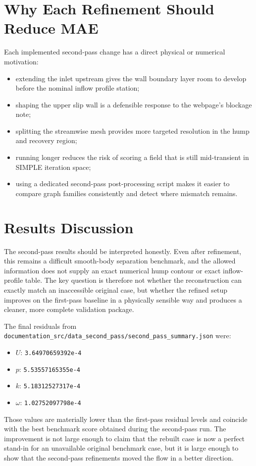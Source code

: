 \documentclass[11pt]{article}
\begin{document}
\section{Why Each Refinement Should Reduce MAE}
Each implemented second-pass change has a direct physical or numerical motivation:
\begin{itemize}
\item extending the inlet upstream gives the wall boundary layer room to develop before the nominal inflow profile station;
\item shaping the upper slip wall is a defensible response to the webpage's blockage note;
\item splitting the streamwise mesh provides more targeted resolution in the hump and recovery region;
\item running longer reduces the risk of scoring a field that is still mid-transient in SIMPLE iteration space;
\item using a dedicated second-pass post-processing script makes it easier to compare graph families consistently and detect where mismatch remains.
\end{itemize}

\section{Results Discussion}
The second-pass results should be interpreted honestly. Even after refinement, this remains a difficult smooth-body separation benchmark, and the allowed information does not supply an exact numerical hump contour or exact inflow-profile table. The key question is therefore not whether the reconstruction can exactly match an inaccessible original case, but whether the refined setup improves on the first-pass baseline in a physically sensible way and produces a cleaner, more complete validation package.

The final residuals from \texttt{documentation\_src/data\_second\_pass/second\_pass\_summary.json} were:
\begin{itemize}
\item \(U\): \texttt{3.64970659392e-4}
\item \(p\): \texttt{5.53557165355e-4}
\item \(k\): \texttt{5.18312527317e-4}
\item \(\omega\): \texttt{1.02752097798e-4}
\end{itemize}

Those values are materially lower than the first-pass residual levels and coincide with the best benchmark score obtained during the second-pass run. The improvement is not large enough to claim that the rebuilt case is now a perfect stand-in for an unavailable original benchmark case, but it is large enough to show that the second-pass refinements moved the flow in a better direction.
\end{document}
